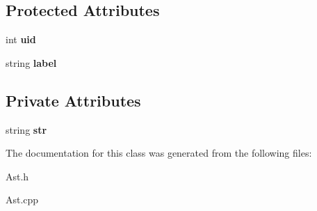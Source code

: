 \subsection*{Protected Attributes}
\begin{DoxyCompactItemize}
\item 
\hypertarget{classAST_a847b778f1c3dd5a19de32de432ee6e15}{int {\bfseries uid}}\label{classAST_a847b778f1c3dd5a19de32de432ee6e15}

\item 
\hypertarget{classAST_ab2e239ccc0688d2341724432ff5a1a31}{string {\bfseries label}}\label{classAST_ab2e239ccc0688d2341724432ff5a1a31}

\end{DoxyCompactItemize}
\subsection*{Private Attributes}
\begin{DoxyCompactItemize}
\item 
\hypertarget{classAstID_ab7c45d962591b1ea1785d2595f1b6497}{string {\bfseries str}}\label{classAstID_ab7c45d962591b1ea1785d2595f1b6497}

\end{DoxyCompactItemize}


The documentation for this class was generated from the following files\-:\begin{DoxyCompactItemize}
\item 
Ast.\-h\item 
Ast.\-cpp\end{DoxyCompactItemize}
